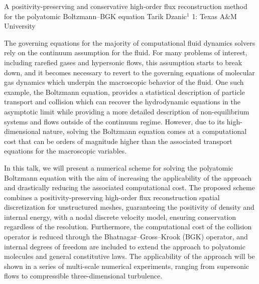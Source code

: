 \vspace{1.5ex}
\abs
{ A positivity-preserving and conservative high-order flux reconstruction method for the polyatomic Boltzmann–BGK equation}
{Tarik Dzanic$^{1}$}
{1: Texas A\&M University}
{The governing equations for the majority of computational fluid dynamics solvers rely on the continuum assumption for the fluid. For many problems of interest, including rarefied gases and hypersonic flows, this assumption starts to break down, and it becomes necessary to revert to the governing equations of molecular gas dynamics which underpin the macroscopic behavior of the fluid. One such example, the Boltzmann equation, provides a statistical description of particle transport and collision which can recover the hydrodynamic equations in the asymptotic limit while providing a more detailed description of non-equilibrium systems and flows outside of the continuum regime. However, due to its high-dimensional nature, solving the Boltzmann equation comes at a computational cost that can be orders of magnitude higher than the associated transport equations for the macroscopic variables.
	
	In this talk, we will present a numerical scheme for solving the polyatomic Boltzmann equation with the aim of increasing the applicability of the approach and drastically reducing the associated computational cost. The proposed scheme combines a positivity-preserving high-order flux reconstruction spatial discretization for unstructured meshes, guaranteeing the positivity of density and internal energy, with a nodal discrete velocity model, ensuring conservation regardless of the resolution. Furthermore, the computational cost of the collision operator is reduced through the Bhatnagar–Gross–Krook (BGK) operator, and internal degrees of freedom are included to extend the approach to polyatomic molecules and general constitutive laws. The applicability of the approach will be shown in a series of multi-scale numerical experiments, ranging from supersonic flows to compressible three-dimensional turbulence.}


